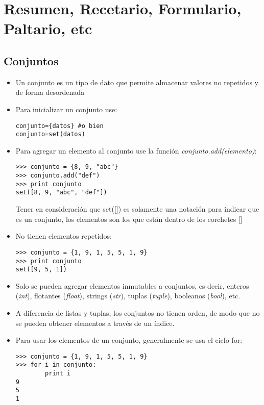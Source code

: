 \section*{Resumen, Recetario, Formulario, Paltario, etc}

\subsection*{Conjuntos}

\begin{itemize}
\item Un conjunto es un tipo de dato que permite almacenar valores no repetidos y de forma desordenada

\item Para inicializar un conjunto use:
\begin{lstlisting}[style=consola]
conjunto={datos} #o bien
conjunto=set(datos)
\end{lstlisting}

\item Para agregar un elemento al conjunto use la función \textit{conjunto.add(elemento)}:
\begin{lstlisting}[style=consola]
>>> conjunto = {8, 9, "abc"}
>>> conjunto.add("def")
>>> print conjunto
set([8, 9, "abc", "def"])
\end{lstlisting}
Tener en consideración que set([]) es solamente una notación para indicar que es un conjunto, los elementos son los que están dentro de los corchetes []

\item No tienen elementos repetidos:
\begin{lstlisting}[style=consola]
>>> conjunto = {1, 9, 1, 5, 5, 1, 9}
>>> print conjunto
set([9, 5, 1])
\end{lstlisting}

\item Solo se pueden agregar elementos inmutables a conjuntos, es decir, enteros (\textit{int}), flotantes (\textit{float}), strings (\textit{str}), tuplas (\textit{tuple}), booleanos (\textit{bool}), etc.

\item A diferencia de listas y tuplas, los conjuntos no tienen orden, de modo que no se pueden obtener elementos a través de un índice.

\item Para usar los elementos de un conjunto, generalmente se usa el ciclo for:
\begin{lstlisting}[style=consola]
>>> conjunto = {1, 9, 1, 5, 5, 1, 9}
>>> for i in conjunto:
        print i
9
5
1
\end{lstlisting}


\end{itemize}
